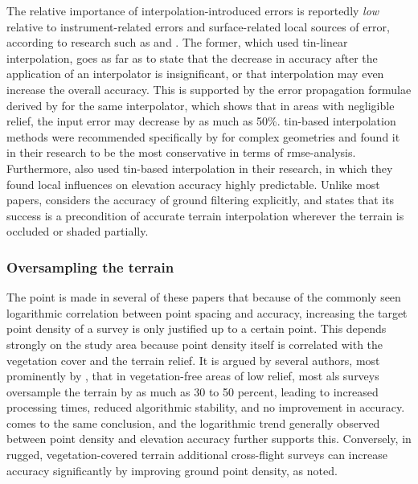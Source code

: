 The relative importance of interpolation-introduced errors is reportedly \textit{low} relative to instrument-related errors and surface-related local sources of error, according to research such as \cite{hodgson_breshanan_2004} and \cite{aguilar_etal_2010}. The former, which used \ac{tin}-linear interpolation, goes as far as to state that the decrease in accuracy after the application of an interpolator is insignificant, or that interpolation may even increase the overall accuracy. This is supported by the error propagation formulae derived by \cite{fan_etal_2014} for the same interpolator, which shows that in areas with negligible relief, the input error may decrease by as much as 50\%. \ac{tin}-based interpolation methods were recommended specifically by \cite{bater_coops_2009} for complex geometries and found it in their research to be the most conservative in terms of \ac{rmse}-analysis. Furthermore, \cite{peng_shih_2006} also used \ac{tin}-based interpolation in their research, in which they found local influences on elevation accuracy highly predictable. Unlike most papers, \cite{aguilar_etal_2010} considers the accuracy of ground filtering explicitly, and states that its success is a precondition of accurate terrain interpolation wherever the terrain is occluded or shaded partially.

\subsubsection{Oversampling the terrain}

The point is made in several of these papers that because of the commonly seen logarithmic correlation between point spacing and accuracy, increasing the target point density of a survey is only justified up to a certain point. This depends strongly on the study area because point density itself is correlated with the vegetation cover and the terrain relief. It is argued by several authors, most prominently by \cite{guo_etal_2010}, that in vegetation-free areas of low relief, most \ac{als} surveys oversample the terrain by as much as 30 to 50 percent, leading to increased processing times, reduced algorithmic stability, and no improvement in accuracy. \cite{bater_coops_2009} comes to the same conclusion, and the logarithmic trend generally observed between point density and elevation accuracy further supports this. Conversely, in rugged, vegetation-covered terrain additional cross-flight surveys can increase accuracy significantly by improving ground point density, as \cite{peng_shih_2006} noted.

